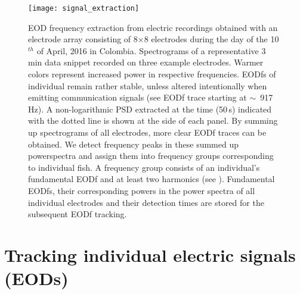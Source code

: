 \begin{figure}[p]
  \centerline{\texttt{[image: signal\_extraction]}}
  \caption{\label{signal_extraction} EOD frequency extraction from electric recordings obtained with an electrode array consisting of 8$\times$8 electrodes during the day of the 10$^{th}$ of April, 2016 in Colombia.  Spectrograms of a representative 3\,min  data snippet recorded on three example electrodes. Warmer colors represent increased power in respective frequencies. EODfs of individual \lepto{} remain rather stable, unless altered intentionally when emitting communication signals (see EODf trace starting at $\sim$~917\,Hz). A non-logarithmic PSD extracted at the time (50\,s) indicated with the dotted line is shown at the side of each panel.  By summing up spectrograms of all electrodes, more clear EODf traces can be obtained.  We detect frequency peaks in these summed up powerspectra and assign them into frequency groups corresponding to individual fish. A frequency group consists of an individual's fundamental EODf and at least two harmonics (see \citealp{Henninger2020}). Fundamental EODfs, their corresponding powers in the power spectra of all individual electrodes and their detection times are stored for the subsequent EODf tracking. } 
\end{figure}

\section{Tracking individual electric signals (EODs)}

